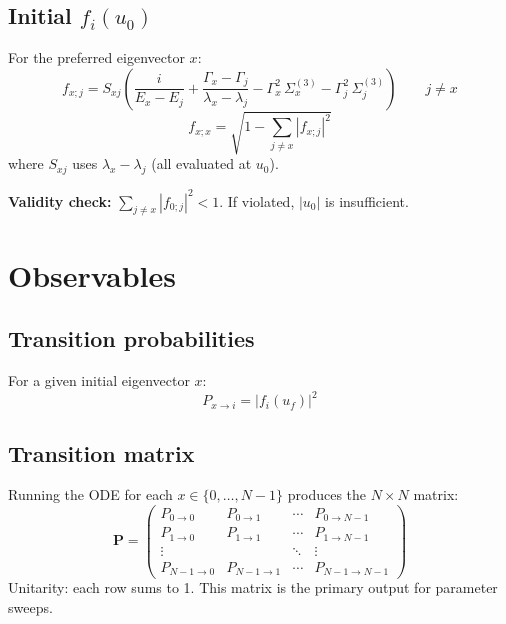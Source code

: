 \documentclass[11pt]{article}
\begin{document}
\subsection{Initial $f_i(u_0)$}

For the preferred eigenvector $x$:
\begin{equation}\label{eq:f0-offdiag}
  f_{x;j} = S_{xj}\left(
    \frac{i}{E_x - E_j}
    + \frac{\Gamma_x - \Gamma_j}{\lambda_x - \lambda_j}
    - \Gamma_x^2\, \Sigma^{(3)}_x
    - \Gamma_j^2\, \Sigma^{(3)}_j
  \right)
  \qquad j \neq x
\end{equation}
\begin{equation}\label{eq:f0-diag}
  f_{x;x} = \sqrt{1 - \sum_{j \neq x} |f_{x;j}|^2}
\end{equation}
where $S_{xj}$ uses $\lambda_x - \lambda_j$ (all evaluated at $u_0$).

\medskip

\medskip
\noindent\textbf{Validity check:} $\sum_{j \neq x} |f_{0;j}|^2 < 1$.  If violated, $|u_0|$ is insufficient.

\section{Observables}

\subsection{Transition probabilities}

For a given initial eigenvector $x$:
\[
  P_{x \to i} = |f_i(u_f)|^2
\]

\subsection{Transition matrix}

Running the ODE for each $x \in \{0,\dots,N{-}1\}$ produces the $N \times N$ matrix:
\[
  \mathbf{P} = \begin{pmatrix}
    P_{0\to 0} & P_{0\to 1} & \cdots & P_{0\to N{-}1} \\
    P_{1\to 0} & P_{1\to 1} & \cdots & P_{1\to N{-}1} \\
    \vdots & & \ddots & \vdots \\
    P_{N{-}1\to 0} & P_{N{-}1\to 1} & \cdots & P_{N{-}1\to N{-}1}
  \end{pmatrix}
\]
Unitarity: each row sums to 1.  This matrix is the primary output for parameter sweeps.
\end{document}
